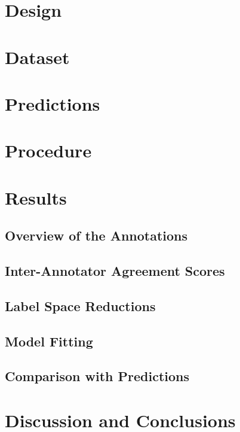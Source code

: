 
\section{Design}

\section{Dataset}

\section{Predictions}

\section{Procedure}

\section{Results}
\subsection{Overview of the Annotations}
\subsection{Inter-Annotator Agreement Scores}
\subsection{Label Space Reductions}
\subsection{Model Fitting}
\subsection{Comparison with Predictions}
\section{Discussion and Conclusions}


